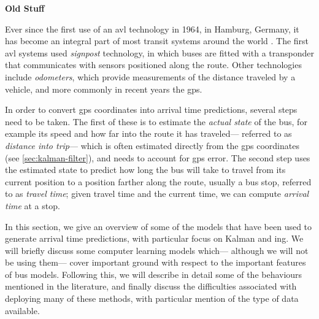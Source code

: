 \textbf{Old Stuff}


Ever since the first use of an \gls{avl} technology in 1964, in Hamburg, Germany,
it has become an integral part of most transit systems around the world
\citep{TCRP_1997,TCRP_2003}.
The first \gls{avl} systems used \emph{signpost} technology,
in which buses are fitted with a transponder that communicates with
sensors positioned along the route.
Other technologies include \emph{odometers},
which provide measurements of the distance traveled by a vehicle,
and more commonly in recent years the \gls{gps}.


In order to convert \gls{gps} coordinates into arrival time predictions,
several steps need to be taken.
The first of these is to estimate the \emph{actual state} of the bus,
for example its speed and how far into the route it has traveled---%
referred to as \emph{distance into trip}---%
which is often estimated directly from the \gls{gps} coordinates
(see \cref{sec:kalman-filter}),
and needs to account for \gls{gps} error.
The second step uses the estimated state
to predict how long the bus will take to travel from its current position
to a position farther along the route, usually a bus stop,
referred to as \emph{travel time};
given travel time and the current time,
we can compute \emph{arrival time} at a stop.


In this section, we give an overview of some of the models that have been used
to generate \rt{} arrival time predictions,
with particular focus on Kalman and \pf{}ing.
We will briefly discuss some computer learning models which---%
although we will not be using them---%
cover important ground with respect to the important features of bus models.
Following this, we will describe in detail some of the
behaviours mentioned in the literature,
and finally discuss the difficulties associated with deploying many of these methods,
with particular mention of the type of data available.




